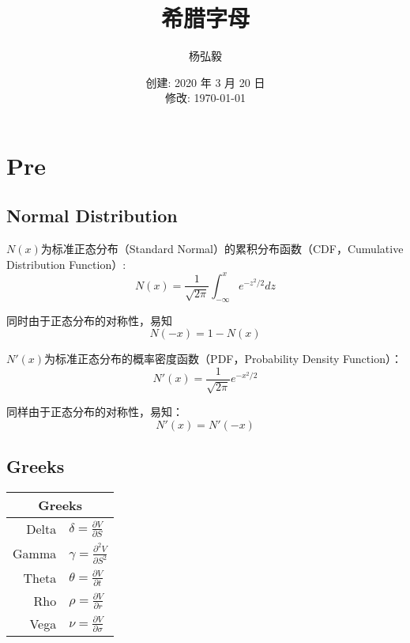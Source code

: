 \documentclass[11pt]{article}
\title{希腊字母}
\author{杨弘毅}
\date{创建: 2020 年 3 月 20 日 \\修改: \today}
\begin{document}
\maketitle

\section{Pre}
\subsection{Normal Distribution}
$N(x)$为标准正态分布（Standard Normal）的累积分布函数（CDF，Cumulative Distribution Function）:
\begin{equation*}
    N(x) = \frac{1}{\sqrt{2\pi}} \int_{-\infty}^{x}e^{-z^2/2}dz
\end{equation*}

同时由于正态分布的对称性，易知
\begin{equation*}
    N(-x) = 1-N(x)
\end{equation*}

$N'(x)$为标准正态分布的概率密度函数（PDF，Probability Density Function）：
\begin{equation*}
    N'(x) = \frac{1}{\sqrt{2\pi}} e^{-x^2/2}
\end{equation*}

同样由于正态分布的对称性，易知：
\begin{equation*}
    N'(x) = N'(-x)
\end{equation*}

\subsection{Greeks}
\begin{table}[H]
\centering
\begin{tabular}{@{}rl@{}}
\toprule
\multicolumn{2}{c}{Greeks} \\ 
\midrule
Delta  & $\delta = \tfrac{\partial V}{\partial S}$ \\
Gamma  & $\gamma = \tfrac{\partial^2 V}{\partial S^2}$ \\
Theta  & $\theta = \tfrac{\partial V}{\partial t}$ \\
Rho    & $\rho = \tfrac{\partial V}{\partial r}$ \\
Vega   & $\nu = \tfrac{\partial V}{\partial\sigma}$ \\
\bottomrule
\end{tabular}
\end{table}
\end{document}
